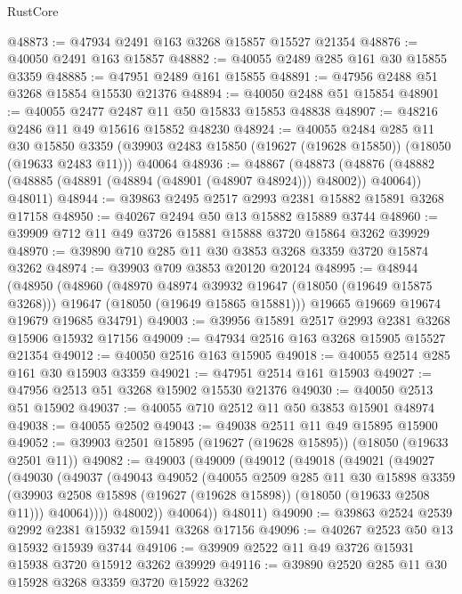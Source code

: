 \begin{lexlean}{RustCore}
\begin{coremodule}
@48873 := @47934 @2491 @163 @3268 @15857 @15527 @21354
@48876 := @40050 @2491 @163 @15857
@48882 := @40055 @2489 @285 @161 @30 @15855 @3359
@48885 := @47951 @2489 @161 @15855
@48891 := @47956 @2488 @51 @3268 @15854 @15530 @21376
@48894 := @40050 @2488 @51 @15854
@48901 := @40055 @2477 @2487 @11 @50 @15833 @15853 @48838
@48907 := @48216 @2486 @11 @49 @15616 @15852 @48230
@48924 := @40055
    @2484
    @285
    @11
    @30
    @15850
    @3359
    (@39903 @2483 @15850 (@19627 (@19628 @15850)) (@18050 (@19633 @2483 @11)))
    @40064
@48936 := @48867
    (@48873
      (@48876 (@48882 (@48885 (@48891 (@48894 (@48901 (@48907 @48924))) @48002)) @40064))
      @48011)
@48944 := @39863 @2495 @2517 @2993 @2381 @15882 @15891 @3268 @17158
@48950 := @40267 @2494 @50 @13 @15882 @15889 @3744
@48960 := @39909 @712 @11 @49 @3726 @15881 @15888 @3720 @15864 @3262 @39929
@48970 := @39890 @710 @285 @11 @30 @3853 @3268 @3359 @3720 @15874 @3262
@48974 := @39903 @709 @3853 @20120 @20124
@48995 := @48944
    (@48950
      (@48960
        (@48970 @48974 @39932 @19647 (@18050 (@19649 @15875 @3268)))
        @19647
        (@18050 (@19649 @15865 @15881)))
      @19665
      @19669
      @19674
      @19679
      @19685
      @34791)
@49003 := @39956 @15891 @2517 @2993 @2381 @3268 @15906 @15932 @17156
@49009 := @47934 @2516 @163 @3268 @15905 @15527 @21354
@49012 := @40050 @2516 @163 @15905
@49018 := @40055 @2514 @285 @161 @30 @15903 @3359
@49021 := @47951 @2514 @161 @15903
@49027 := @47956 @2513 @51 @3268 @15902 @15530 @21376
@49030 := @40050 @2513 @51 @15902
@49037 := @40055 @710 @2512 @11 @50 @3853 @15901 @48974
@49038 := @40055 @2502
@49043 := @49038 @2511 @11 @49 @15895 @15900
@49052 := @39903 @2501 @15895 (@19627 (@19628 @15895)) (@18050 (@19633 @2501 @11))
@49082 := @49003
    (@49009
      (@49012
        (@49018
          (@49021
            (@49027
              (@49030
                (@49037
                  (@49043
                    @49052
                    (@40055
                      @2509
                      @285
                      @11
                      @30
                      @15898
                      @3359
                      (@39903 @2508 @15898 (@19627 (@19628 @15898)) (@18050 (@19633 @2508 @11)))
                      @40064))))
              @48002))
          @40064))
      @48011)
@49090 := @39863 @2524 @2539 @2992 @2381 @15932 @15941 @3268 @17156
@49096 := @40267 @2523 @50 @13 @15932 @15939 @3744
@49106 := @39909 @2522 @11 @49 @3726 @15931 @15938 @3720 @15912 @3262 @39929
@49116 := @39890 @2520 @285 @11 @30 @15928 @3268 @3359 @3720 @15922 @3262

\end{coremodule}
\end{lexlean}
